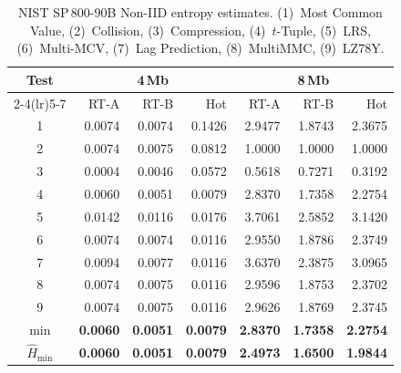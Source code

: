 \begin{table}[t]
	\centering

	\footnotesize \caption{NIST SP\,800-90B Non-IID entropy estimates.
		(1)~Most Common Value, (2)~Collision, (3)~Compression, (4)~$t$-Tuple,
		(5)~LRS, (6)~Multi-MCV, (7)~Lag Prediction, (8)~MultiMMC, (9)~LZ78Y.}
	\label{tab:nist90b} \setlength{\tabcolsep}{10pt}
	\begin{tabular*}{\columnwidth}{@{\extracolsep{\fill}}crrrrrr}
		\toprule
		Test & \multicolumn{3}{c}{4\,Mb} & \multicolumn{3}{c}{8\,Mb} \\
		\cmidrule(lr){2-4}\cmidrule(lr){5-7}
		& RT-A & RT-B & Hot & RT-A & RT-B & Hot \\
		\midrule
		1 & 0.0074 & 0.0074 & 0.1426 & 2.9477 & 1.8743 & 2.3675 \\
		2 & 0.0074 & 0.0075 & 0.0812 & 1.0000 & 1.0000 & 1.0000 \\
		3 & 0.0004 & 0.0046 & 0.0572 & 0.5618 & 0.7271 & 0.3192 \\
		4 & 0.0060 & 0.0051 & 0.0079 & 2.8370 & 1.7358 & 2.2754 \\
		5 & 0.0142 & 0.0116 & 0.0176 & 3.7061 & 2.5852 & 3.1420 \\
		6 & 0.0074 & 0.0074 & 0.0116 & 2.9550 & 1.8786 & 2.3749 \\
		7 & 0.0094 & 0.0077 & 0.0116 & 3.6370 & 2.3875 & 3.0965 \\
		8 & 0.0074 & 0.0075 & 0.0116 & 2.9596 & 1.8753 & 2.3702 \\
		9 & 0.0074 & 0.0075 & 0.0116 & 2.9626 & 1.8769 & 2.3745 \\
		\midrule
		$\min$ & \textbf{0.0060} & \textbf{0.0051} & \textbf{0.0079} & \textbf{2.8370} & \textbf{1.7358} & \textbf{2.2754} \\
		\midrule
		$\hat{H}_{\min}$ & \textbf{0.0060} & \textbf{0.0051} & \textbf{0.0079} & \textbf{2.4973} & \textbf{1.6500} & \textbf{1.9844} \\
		\bottomrule
	\end{tabular*}
\end{table}